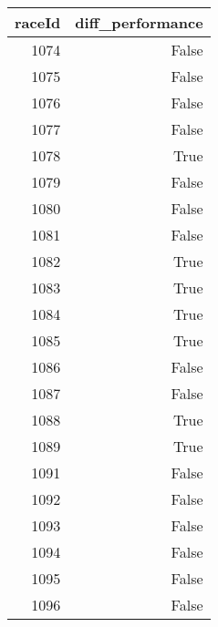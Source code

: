 \begin{tabular}{rr}
\toprule
raceId & diff_performance \\
\midrule
1074 & False \\
1075 & False \\
1076 & False \\
1077 & False \\
1078 & True \\
1079 & False \\
1080 & False \\
1081 & False \\
1082 & True \\
1083 & True \\
1084 & True \\
1085 & True \\
1086 & False \\
1087 & False \\
1088 & True \\
1089 & True \\
1091 & False \\
1092 & False \\
1093 & False \\
1094 & False \\
1095 & False \\
1096 & False \\
\bottomrule
\end{tabular}
